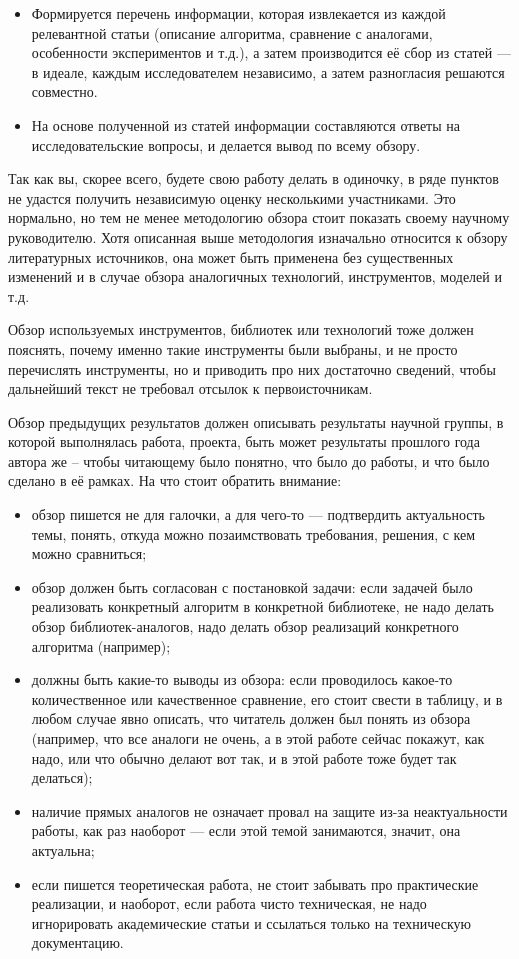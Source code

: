 \documentclass{article}
\begin{document}
\begin{itemize}
    \item Формируется перечень информации, которая извлекается из каждой релевантной статьи (описание алгоритма, сравнение с аналогами, особенности экспериментов и т.д.), а затем производится её сбор из статей --- в идеале, каждым исследователем независимо, а затем разногласия решаются совместно.
    \item На основе полученной из статей информации составляются ответы на исследовательские вопросы, и делается вывод по всему обзору.
\end{itemize}

Так как вы, скорее всего, будете свою работу делать в одиночку, в ряде пунктов не удастся получить независимую оценку несколькими участниками. Это нормально, но тем не менее методологию обзора стоит показать своему научному руководителю. Хотя описанная выше методология изначально относится к обзору литературных источников, она может быть применена без существенных изменений и в случае обзора аналогичных технологий, инструментов, моделей и т.д. 

Обзор используемых инструментов, библиотек или технологий тоже должен пояснять, почему именно такие инструменты были выбраны, и не просто перечислять инструменты, но и приводить про них достаточно сведений, чтобы дальнейший текст не требовал отсылок к первоисточникам. 

Обзор предыдущих результатов должен описывать результаты научной группы, в которой выполнялась работа, проекта, быть может результаты прошлого года автора же -- чтобы читающему было понятно, что было до работы, и что было сделано в её рамках. На что стоит обратить внимание:

\begin{itemize}
    \item обзор пишется не для галочки, а для чего-то --- подтвердить актуальность темы, понять, откуда можно позаимствовать требования, решения, с кем можно сравниться;
    \item обзор должен быть согласован с постановкой задачи: если задачей было реализовать конкретный алгоритм в конкретной библиотеке, не надо делать обзор библиотек-аналогов, надо делать обзор реализаций конкретного алгоритма (например);
    \item должны быть какие-то выводы из обзора: если проводилось какое-то количественное или качественное сравнение, его стоит свести в таблицу, и в любом случае явно описать, что читатель должен был  понять из обзора (например, что все аналоги не очень, а в этой работе сейчас покажут, как надо, или что обычно делают вот так, и в этой работе тоже будет так делаться);
    \item наличие прямых аналогов не означает провал на защите из-за неактуальности работы, как раз наоборот --- если этой темой занимаются, значит, она актуальна;
    \item если пишется теоретическая работа, не стоит забывать про практические реализации, и наоборот, если работа чисто техническая, не надо игнорировать академические статьи и ссылаться только на техническую документацию.
\end{itemize}
\end{document}
